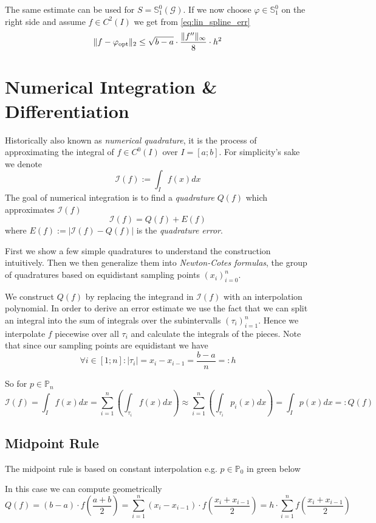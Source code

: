 The same estimate can be used for \(S = \mathbb{S}_1^0(\mathcal{G})\).
If we now choose \(\varphi \in \mathbb{S}_1^0\) on the right side and assume \(f \in C^2(I)\) we get from \cref{eq:lin_spline_err}
\[\|f - \varphi_{\operatorname{opt}}\|_2 \leq \sqrt{b - a} \cdot \frac{\|f''\|_\infty}{8} \cdot h^2\]

\section{Numerical Integration \& Differentiation}
Historically also known as \emph{numerical quadrature}, it is the process of approximating the integral of \(f \in C^0(I)\) over \(I = [a; b]\).
For simplicity's sake we denote
\[\mathcal{I}(f) := \int_I f(x) dx\]
The goal of numerical integration is to find a \emph{quadrature} \(Q(f)\) which approximates \(\mathcal{I}(f)\)
\[\mathcal{I}(f) = Q(f) + E(f)\]
where \(E(f) := |\mathcal{I}(f) - Q(f)|\) is the \emph{quadrature error}.

First we show a few simple quadratures to understand the construction intuitively.
Then we then generalize them into \emph{Newton-Cotes formulas}, the group of quadratures based on equidistant sampling points \((x_i)_{i=0}^n\).

We construct \(Q(f)\) by replacing the integrand in \(\mathcal{I}(f)\) with an interpolation polynomial.
In order to derive an error estimate we use the fact that we can split an integral into the sum of integrals over the subintervalls \((\tau_i)_{i=1}^n\).
Hence we interpolate \(f\) piecewise over all \(\tau_i\) and calculate the integrals of the pieces.
Note that since our sampling points are equidistant we have
\[\forall i \in [1;n]: |\tau_i| = x_i - x_{i-1} = \frac{b-a}{n} =: h\]

So for \(p \in \mathbb{P}_n\)
\[\mathcal{I}(f) = \int_I f(x)dx = \sum_{i=1}^n \left(\int_{\tau_i} f(x) dx\right) \approx \sum_{i=1}^n \left(\int_{\tau_i} p_i(x) dx\right) = \int_I p(x)dx =: Q(f)\]

\subsection{Midpoint Rule}
The midpoint rule is based on constant interpolation e.g. \(p \in \mathbb{P}_0\) in green below
\begin{center}
   
\end{center}
In this case we can compute geometrically
\[Q(f) = (b-a) \cdot f\left(\frac{a + b}{2}\right) = \sum_{i=1}^n (x_i - x_{i-1}) \cdot f\left(\frac{x_i + x_{i-1}}{2}\right) = h \cdot \sum_{i=1}^n f\left(\frac{x_i + x_{i-1}}{2}\right)\]

